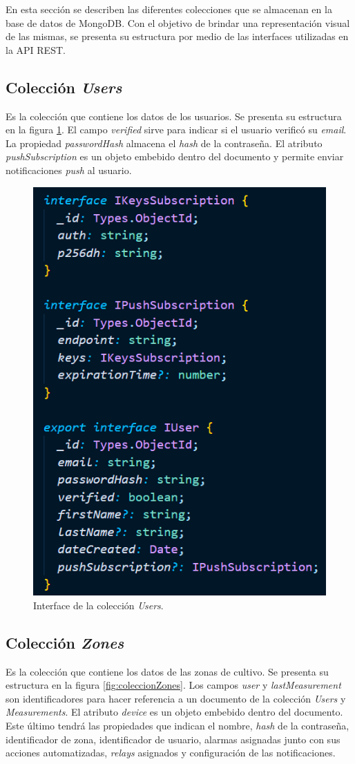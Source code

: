En esta sección se describen las diferentes colecciones que se almacenan en la base de datos de MongoDB. Con el objetivo de brindar una representación visual de las mismas, se presenta su estructura por medio de las interfaces utilizadas en la API REST.

\subsection{Colección \textit{Users}}

Es la colección que contiene los datos de los usuarios. Se presenta su estructura en la figura \ref{fig:coleccionUsers}. El campo \textit{verified} sirve para indicar si el usuario verificó su \textit{email}. La propiedad \textit{passwordHash} almacena el \emph{hash} de la contraseña. El atributo \textit{pushSubscription} es un objeto embebido dentro del documento y permite enviar notificaciones \emph{push} al usuario. 

\begin{figure}[H]
	\centering
	\includegraphics[width=.5\textwidth]{./Figures/Coleccion Users.png}
	\caption{Interface de la colección \textit{Users}.}
	\label{fig:coleccionUsers}
\end{figure}

\subsection{Colección \textit{Zones}}

Es la colección que contiene los datos de las zonas de cultivo. Se presenta su estructura en la figura \ref{fig:coleccionZones}. Los campos \textit{user} y \textit{lastMeasurement} son identificadores para hacer referencia a un documento de la colección \textit{Users} y \textit{Measurements}. El atributo \textit{device} es un objeto embebido dentro del documento. Este último tendrá las propiedades que indican el nombre, \emph{hash} de la contraseña, identificador de zona, identificador de usuario, alarmas asignadas junto con sus acciones automatizadas, \emph{relays} asignados y configuración de las notificaciones.

